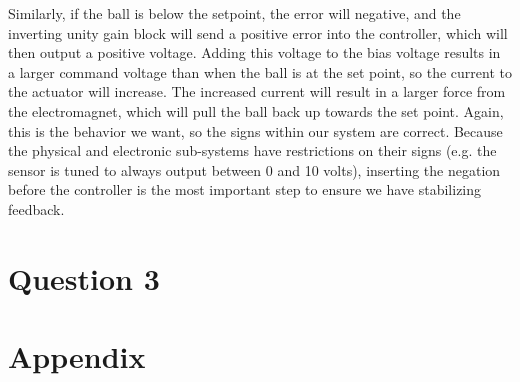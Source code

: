 \documentclass{article}
\theoremstyle{plain}
\theoremstyle{definition}
\theoremstyle{remark}
\begin{document}
Similarly, if the ball is below the setpoint, the error will negative, and the inverting unity gain block will send a positive error into the controller, which will then output a positive voltage. Adding this voltage to the bias voltage results in a larger command voltage than when the ball is at the set point, so the current to the actuator will increase. The increased current will result in a larger force from the electromagnet, which will pull the ball back up towards the set point. Again, this is the behavior we want, so the signs within our system are correct. Because the physical and electronic sub-systems have restrictions on their signs (e.g. the sensor is tuned to always output between 0 and 10 volts), inserting the negation before the controller is the most important step to ensure we have stabilizing feedback. 

\section*{Question 3}

\newpage
\section*{Appendix}
\end{document}
